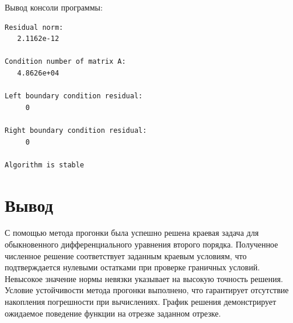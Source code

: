 \documentclass[12pt,a4paper]{article}
\begin{document}
Вывод консоли программы:
\begin{verbatim}
Residual norm:
   2.1162e-12

Condition number of matrix A:
   4.8626e+04

Left boundary condition residual:
     0

Right boundary condition residual:
     0

Algorithm is stable
\end{verbatim}

\section{Вывод}

С помощью метода прогонки была успешно решена краевая задача для обыкновенного 
дифференциального уравнения второго порядка. Полученное численное решение соответствует
заданным краевым условиям, что подтверждается нулевыми остатками при проверке граничных
условий. Невысокое значение нормы невязки указывает на высокую точность решения. 
Условие устойчивости метода прогонки выполнено, что гарантирует отсутствие накопления
погрешности при вычислениях. График решения демонстрирует ожидаемое поведение функции
на отрезке заданном отрезке.
\end{document}
